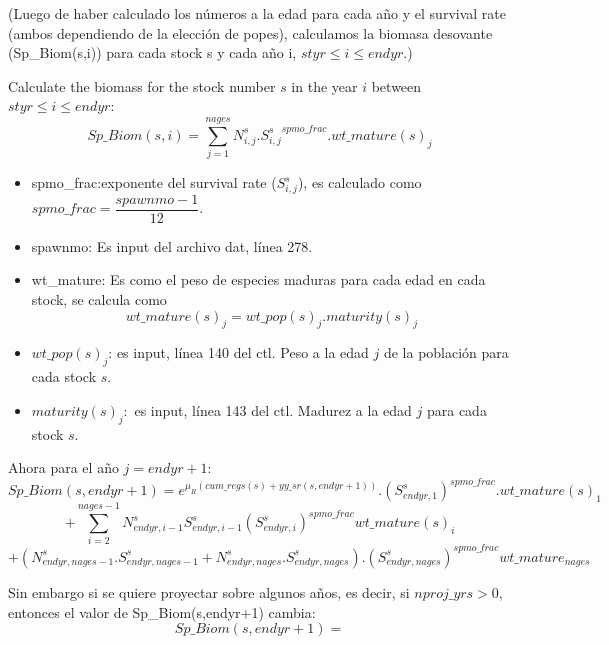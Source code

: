\documentclass{article}
\begin{document}
(Luego de haber calculado los números a la edad para cada año y el survival rate (ambos dependiendo de la elección de popes), calculamos la biomasa desovante (Sp\_Biom(s,i)) para cada stock s y cada año i, $styr \leq i \leq endyr$.)

Calculate the biomass for the stock number $s$ in the year $i$ between $styr \leq i \leq endyr$:
    \begin{equation}
    Sp\_Biom(s,i)=\sum_{j=1}^{nages}N^s_{i,j}.{S^s_{i,j}}^{spmo\_frac}.wt\_mature(s)_j
\end{equation}
\begin{itemize}
    \item spmo\_frac:exponente del survival rate ($S^s_{i,j}$), es calculado como 
    $spmo\_frac=\dfrac{spawnmo-1}{12}$.
    \item spawnmo: Es input del archivo dat, línea 278.
    \item wt\_mature: Es como el peso de especies maduras para cada edad en cada stock, se calcula como
    \begin{equation}
        wt\_mature(s)_j=wt\_pop(s)_j.maturity(s)_j
    \end{equation}
\end{itemize}
\begin{itemize}
    \item $wt\_pop(s)_j$: es input, línea 140 del ctl. Peso a la edad $j$ de la población para cada stock $s$.
    \item $maturity(s)_j:$ es input, línea 143 del ctl. Madurez a la edad $j$ para cada stock $s$.
\end{itemize}
Ahora para el año $j=endyr+1$:
\begin{equation}
Sp\_Biom(s,endyr+1)=e^{\mu_R(cum\_regs(s)+yy\_sr(s,endyr+1))}.(S^{s}_{endyr,1})^{spmo\_frac
    }.wt\_mature(s)_1
\end{equation}
\begin{equation*}
+\sum_{i=2}^{nages-1}N^{s}_{endyr,i-1}S^{s}_{endyr,i-1}(S^s_{endyr,i})^{spmo\_frac}wt\_mature(s)_i
\end{equation*}
\begin{equation*}
    +(N^{s}_{endyr,nages-1}.S^s_{endyr,nages-1}+N^s_{endyr,nages}.S^s_{endyr,nages}).(S^s_{endyr,nages})^{spmo\_frac}wt\_mature_{nages}
\end{equation*}

Sin embargo si se quiere proyectar sobre algunos años, es decir, si $nproj\_yrs>0$, entonces el valor de Sp\_Biom(s,endyr+1) cambia:
\begin{equation}
    Sp\_Biom(s,endyr+1)=
\end{equation}
\end{document}

